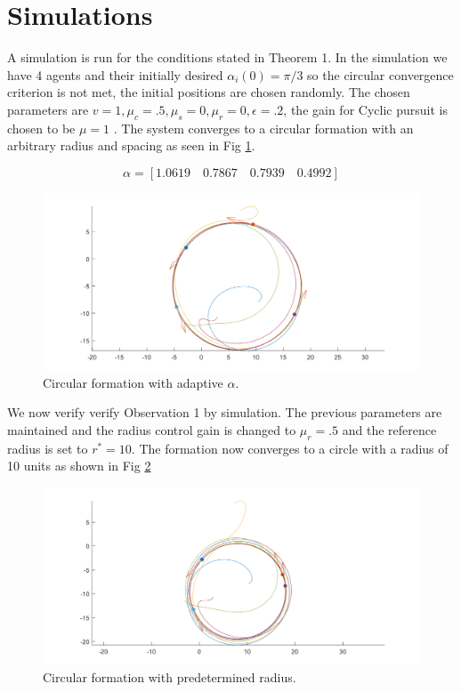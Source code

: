 \section{Simulations}

A simulation is run for the conditions stated in Theorem 1. In the simulation we have 4 agents and their initially desired $\alpha_i(0) = \pi / 3$ so the circular convergence criterion is not met, the initial positions are chosen randomly. The chosen parameters are $v=1, \mu_c=.5,\mu_s=0,\mu_r=0,\epsilon=.2$, the gain for Cyclic pursuit is chosen to be $\mu=1$ . The system converges to a circular formation with an arbitrary radius and spacing as seen in Fig \ref{fig:Adaptive}.

\begin{equation*}
  \alpha = [1.0619 \quad 0.7867 \quad 0.7939 \quad 0.4992]
\end{equation*}
\begin{figure}
	\includegraphics[width=\linewidth]{Attachments/Figure41.png}
	\caption{Circular formation with adaptive $\alpha$.}
	\label{fig:Adaptive}
\end{figure}

We now verify verify Observation 1 by simulation. The previous parameters are maintained and the radius control gain is changed to $\mu_r=.5$ and the reference radius is set to $r^*=10$. The formation now converges to a circle with a radius of 10 units as shown in Fig \ref{fig:RadiusConvergence}
\begin{figure}
	\includegraphics[width=\linewidth]{Attachments/Figure43.png}
	\caption{Circular formation with predetermined radius.}
	\label{fig:RadiusConvergence}
\end{figure}

